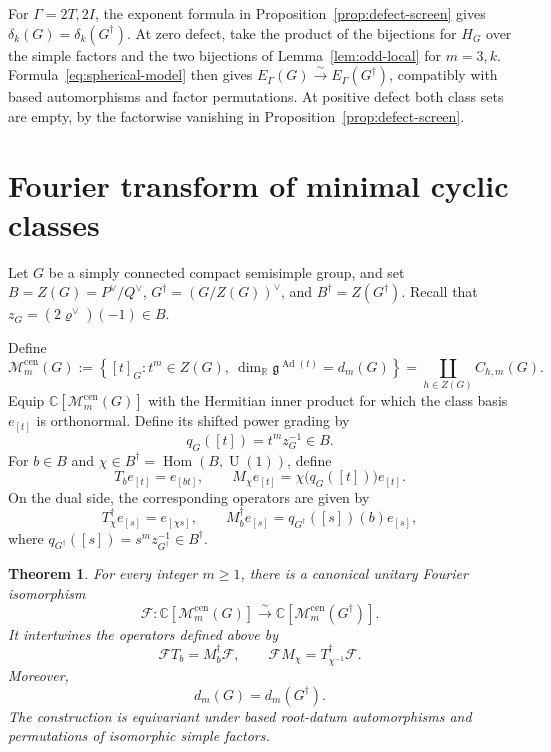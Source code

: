 \documentclass[11pt,a4paper,reqno]{amsart}
\theoremstyle{plain}
\newtheorem{theorem}{Theorem}[section]
\theoremstyle{definition}
\theoremstyle{remark}
\numberwithin{equation}{section}
\DeclareMathOperator{\Hom}{Hom}
\DeclareMathOperator{\Ad}{Ad}
\newcommand{\UU}{\operatorname{U}}
\newcommand{\CC}{\mathbb C}
\newcommand{\RR}{\mathbb R}
\newcommand{\fg}{\mathfrak g}
\newcommand{\cM}{\mathcal M}
\newcommand{\rh}{\varrho^\vee}
\begin{document}
For $\Gamma=2T,2I$, the exponent formula in Proposition~\ref{prop:defect-screen} gives $\delta_k(G)=\delta_k(G^\dagger)$. At zero defect, take the product of the bijections for $H_G$ over the simple factors and the two bijections of Lemma~\ref{lem:odd-local} for $m=3,k$. Formula~\eqref{eq:spherical-model} then gives $E_\Gamma(G)\xrightarrow{\sim}E_\Gamma(G^\dagger)$, compatibly with based automorphisms and factor permutations. At positive defect both class sets are empty, by the factorwise vanishing in Proposition~\ref{prop:defect-screen}.

\section{Fourier transform of minimal cyclic classes}\label{sec:minimum-fourier}

Let $G$ be a simply connected compact semisimple group, and set $B=Z(G)=P^\vee/Q^\vee$, $G^\dagger=(G/Z(G))^\vee$, and $B^\dagger=Z(G^\dagger)$. Recall that $z_G=(2\rh)(-1)\in B$.

Define
\[
\cM_m^{\mathrm{cen}}(G):=\left\{[t]_G:t^m\in Z(G),\ \dim_{\RR}\fg^{\Ad(t)}=d_m(G)\right\}=\coprod_{h\in Z(G)} C_{h,m}(G).
\]
Equip $\CC[\cM_m^{\mathrm{cen}}(G)]$ with the Hermitian inner product for which the class basis $e_{[t]}$ is orthonormal. Define its shifted power grading by
\[
q_G([t])=t^m z_G^{-1}\in B.
\]
For $b\in B$ and $\chi\in B^\dagger=\Hom(B,\UU(1))$, define
\[
T_b e_{[t]}=e_{[bt]},\qquad
M_\chi e_{[t]}=\chi\bigl(q_G([t])\bigr)e_{[t]}.
\]
On the dual side, the corresponding operators are given by
\[
T_\chi^\dagger e_{[s]}=e_{[\chi s]},\qquad
M_b^\dagger e_{[s]}=q_{G^\dagger}([s])(b)e_{[s]},
\]
where $q_{G^\dagger}([s])=s^m z_{G^\dagger}^{-1}\in B^\dagger$.

\begin{theorem}\label{thm:minimum-fourier}
For every integer $m\ge 1$, there is a canonical unitary Fourier isomorphism
\[
\mathcal F\colon\CC[\cM_m^{\mathrm{cen}}(G)]\xrightarrow{\sim}\CC[\cM_m^{\mathrm{cen}}(G^\dagger)].
\]
It intertwines the operators defined above by
\[
\mathcal F T_b=M_b^\dagger\mathcal F,\qquad \mathcal F M_\chi=T_{\chi^{-1}}^\dagger\mathcal F.
\]
Moreover,
\[
d_m(G)=d_m(G^\dagger).
\]
The construction is equivariant under based root-datum automorphisms and permutations of isomorphic simple factors.
\end{theorem}
\end{document}
